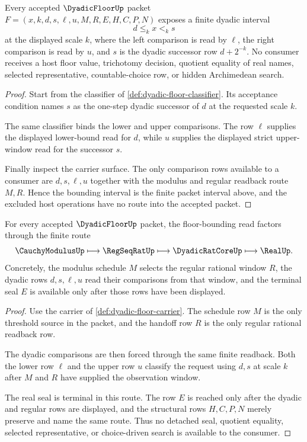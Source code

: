 \begin{theorem}
\label{thm:dyadic-floor-bounding-interval}
Every accepted $\DyadicFloorUp$ packet $F=(x,k,d,s,\ell,u,M,R,E,H,C,P,N)$ exposes a finite dyadic interval
$$
d\leq_k x <_k s
$$
at the displayed scale $k$, where the left comparison is read by $\ell$, the right comparison is read by $u$, and $s$ is the dyadic successor row $d+2^{-k}$. No consumer receives a host floor value, trichotomy decision, quotient equality of real names, selected representative, countable-choice row, or hidden Archimedean search.
\end{theorem}
\begin{proof}
Start from the classifier of \autoref{def:dyadic-floor-classifier}. Its acceptance condition names $s$ as the one-step dyadic successor of $d$ at the requested scale $k$.

The same classifier binds the lower and upper comparisons. The row $\ell$ supplies the displayed lower-bound read for $d$, while $u$ supplies the displayed strict upper-window read for the successor $s$.

Finally inspect the carrier surface. The only comparison rows available to a consumer are $d,s,\ell,u$ together with the modulus and regular readback route $M,R$. Hence the bounding interval is the finite packet interval above, and the excluded host operations have no route into the accepted packet.
\end{proof}

\begin{theorem}
\label{thm:dyadic-floor-regseqrat-handoff}
For every accepted $\DyadicFloorUp$ packet, the floor-bounding read factors through the finite route
$$
\CauchyModulusUp\longmapsto \RegSeqRatUp\longmapsto \DyadicRatCoreUp\longmapsto \RealUp .
$$
Concretely, the modulus schedule $M$ selects the regular rational window $R$, the dyadic rows $d,s,\ell,u$ read their comparisons from that window, and the terminal seal $E$ is available only after those rows have been displayed.
\end{theorem}
\begin{proof}
Use the carrier of \autoref{def:dyadic-floor-carrier}. The schedule row $M$ is the only threshold source in the packet, and the handoff row $R$ is the only regular rational readback row.

The dyadic comparisons are then forced through the same finite readback. Both the lower row $\ell$ and the upper row $u$ classify the request using $d,s$ at scale $k$ after $M$ and $R$ have supplied the observation window.

The real seal is terminal in this route. The row $E$ is reached only after the dyadic and regular rows are displayed, and the structural rows $H,C,P,N$ merely preserve and name the same route. Thus no detached seal, quotient equality, selected representative, or choice-driven search is available to the consumer.
\end{proof}

